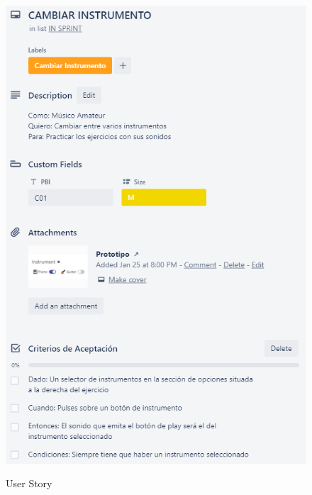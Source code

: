 \documentclass[12pt,twoside,titlepage]{report}
\begin{document}
{\begin{figure}[H]
    \centering
    \includegraphics[scale=1.3]{Scrum/User Stories/Instrumentos}
    \label{fig:Instrumentos}
    \caption{User Story}
\end{figure}

}
\end{document}
